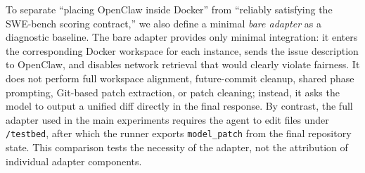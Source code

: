 To separate ``placing OpenClaw inside Docker'' from ``reliably satisfying the SWE-bench scoring contract,'' we also define a minimal \emph{bare adapter} as a diagnostic baseline. The bare adapter provides only minimal integration: it enters the corresponding Docker workspace for each instance, sends the issue description to OpenClaw, and disables network retrieval that would clearly violate fairness. It does not perform full workspace alignment, future-commit cleanup, shared phase prompting, Git-based patch extraction, or patch cleaning; instead, it asks the model to output a unified diff directly in the final response. By contrast, the full adapter used in the main experiments requires the agent to edit files under \texttt{/testbed}, after which the runner exports \texttt{model\_patch} from the final repository state. This comparison tests the necessity of the adapter, not the attribution of individual adapter components.
